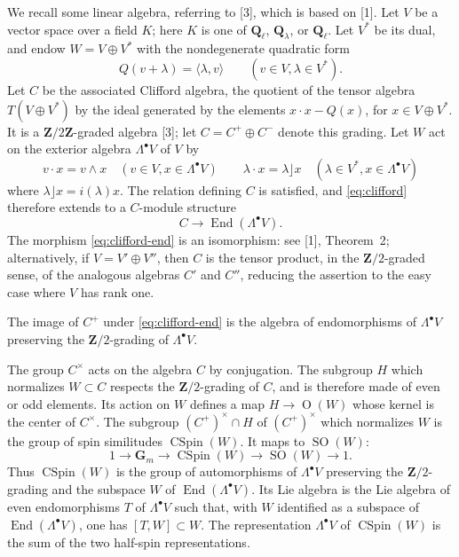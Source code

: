 \documentclass[11pt,a4paper]{article}
\theoremstyle{plain}
\theoremstyle{definition}
\DeclareMathOperator{\End}{End}
\DeclareMathOperator{\CSpin}{CSpin}
\DeclareMathOperator{\SO}{SO}
\DeclareMathOperator{\Ogrp}{O}
\begin{document}
We recall some linear algebra, referring to [3], which is based on [1]. Let $V$ be a vector space over a field $K$; here $K$ is one of $\mathbf{Q}_\ell$, $\mathbf{Q}_\lambda$, or $\mathbf{Q}_\ell$. Let $V^*$ be its dual, and endow $W = V \oplus V^*$ with the nondegenerate quadratic form
\[
Q(v + \lambda) = \langle \lambda, v \rangle \qquad (v \in V, \lambda \in V^*) .
\]
Let $C$ be the associated Clifford algebra, the quotient of the tensor algebra $T(V \oplus V^*)$ by the ideal generated by the elements $x \cdot x - Q(x)$, for $x \in V \oplus V^*$. It is a $\mathbf{Z}/2\mathbf{Z}$-graded algebra [3]; let $C = C^+ \oplus C^-$ denote this grading. Let $W$ act on the exterior algebra $\Lambda^\bullet V$ of $V$ by
\begin{equation}\label{eq:clifford}
v \cdot x = v \wedge x \quad (v \in V, x \in \Lambda^\bullet V) \qquad
\lambda \cdot x = \lambda \rfloor x \quad (\lambda \in V^*, x \in \Lambda^\bullet V)
\end{equation}
where $\lambda \rfloor x = i(\lambda)x$. The relation defining $C$ is satisfied, and \eqref{eq:clifford} therefore extends to a $C$-module structure
\begin{equation}\label{eq:clifford-end}
C \longrightarrow \End(\Lambda^\bullet V) .
\end{equation}
The morphism \eqref{eq:clifford-end} is an isomorphism: see [1], Theorem~2; alternatively, if $V = V' \oplus V''$, then $C$ is the tensor product, in the $\mathbf{Z}/2$-graded sense, of the analogous algebras $C'$ and $C''$, reducing the assertion to the easy case where $V$ has rank one.

The image of $C^+$ under \eqref{eq:clifford-end} is the algebra of endomorphisms of $\Lambda^\bullet V$ preserving the $\mathbf{Z}/2$-grading of $\Lambda^\bullet V$.

The group $C^\times$ acts on the algebra $C$ by conjugation. The subgroup $H$ which normalizes $W \subset C$ respects the $\mathbf{Z}/2$-grading of $C$, and is therefore made of even or odd elements. Its action on $W$ defines a map $H \to \Ogrp(W)$ whose kernel is the center of $C^\times$. The subgroup $(C^+)^\times \cap H$ of $(C^+)^\times$ which normalizes $W$ is the group of spin similitudes $\CSpin(W)$. It maps to $\SO(W)$:
\[
1 \longrightarrow \mathbf{G}_m \longrightarrow \CSpin(W) \longrightarrow \SO(W) \longrightarrow 1 .
\]
Thus $\CSpin(W)$ is the group of automorphisms of $\Lambda^\bullet V$ preserving the $\mathbf{Z}/2$-grading and the subspace $W$ of $\End(\Lambda^\bullet V)$. Its Lie algebra is the Lie algebra of even endomorphisms $T$ of $\Lambda^\bullet V$ such that, with $W$ identified as a subspace of $\End(\Lambda^\bullet V)$, one has $[T, W] \subset W$. The representation $\Lambda^\bullet V$ of $\CSpin(W)$ is the sum of the two half-spin representations.
\end{document}
